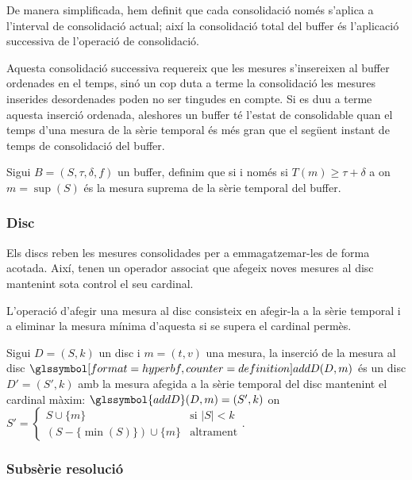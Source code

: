 De manera simplificada, hem definit que cada consolidació només
s'aplica a l'interval de consolidació actual; així la consolidació
total del buffer és l'aplicació successiva de l'operació de
consolidació. 

Aquesta consolidació successiva requereix que les mesures s'insereixen
al buffer ordenades en el temps, sinó un cop duta a terme la
consolidació les mesures inserides desordenades poden no ser tingudes
en compte. Si es duu a terme aquesta inserció ordenada, aleshores un
buffer té l'estat de consolidable quan el temps d'una mesura de la
sèrie temporal és més gran que el següent instant de temps de
consolidació del buffer.
\begin{definition}\label{def:model:buffer_consolidable}
  Sigui $B=(S,\tau,\delta,f)$ un buffer, definim que
   si i només si $T(m) \geq \tau+\delta$ a on
  $m=\sup(S)$ és la mesura suprema de la sèrie temporal del buffer.
\end{definition}



\subsubsection{Disc}

Els discs reben les mesures consolidades per a emmagatzemar-les de
forma acotada. Així, tenen un operador associat que afegeix noves
mesures al disc mantenint sota control el seu cardinal.


L'operació d'afegir una mesura al disc consisteix en afegir-la a la
sèrie temporal i a eliminar la mesura mínima d'aquesta si se supera el
cardinal permès.
\begin{definition}
  Sigui $D=(S,k)$ un disc i $m=(t,v)$ una mesura, la inserció de la
  mesura al disc $\glssymboldef{addD}(D,m)$ és un disc $D'=(S',k)$
  amb la mesura afegida a la sèrie temporal del disc mantenint el
  cardinal màxim: $\glssymbol{addD}(D,m) = (S',k)$ on $S'=
  \begin{cases}
      S\cup\{m\} &\text{si }  |S|<k\\
      (S-\{\min(S)\}) \cup \{m\} &\text{altrament}
    \end{cases}$.
\end{definition}




\subsubsection{Subsèrie resolució}

